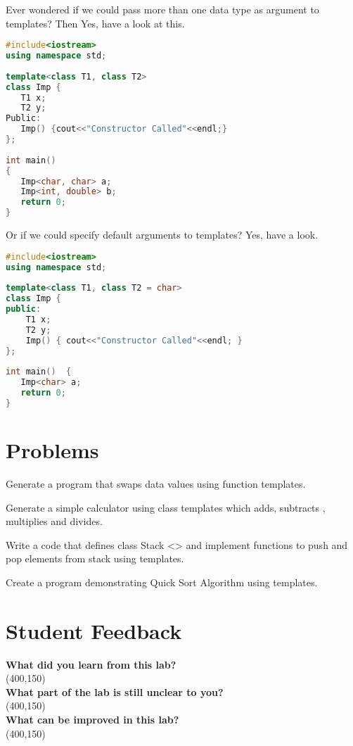 \documentclass[11pt,fleqn]{book} %
\begin{document}
Ever wondered if we could pass more than one data type as argument to templates? Then Yes, have a look at this.

\begin{lstlisting}[language=C++, caption= Important Fact 1]
#include<iostream>
using namespace std;
 
template<class T1, class T2>
class Imp {
   T1 x;
   T2 y;
Public:
   Imp() {cout<<"Constructor Called"<<endl;}
};
 
int main()  
{
   Imp<char, char> a;
   Imp<int, double> b;
   return 0;
}
\end{lstlisting}

Or if we could specify default arguments to templates? Yes, have a look.
\begin{lstlisting}[language=C++, caption= Important Fact 2]
#include<iostream>
using namespace std;
 
template<class T1, class T2 = char>
class Imp {
public:
    T1 x;
    T2 y;
    Imp() { cout<<"Constructor Called"<<endl; }
};
 
int main()  {
   Imp<char> a; 
   return 0;
}
\end{lstlisting}

\section{Problems}

\begin{problem} Generate a program that swaps data values using function templates.\\
\end{problem}
\begin{problem} Generate a simple calculator using class templates which adds, subtracts , multiplies and divides.\\
\end{problem}
\begin{problem} Write a code that defines class Stack <> and implement functions to push and pop elements from stack using templates.\\
\end{problem}
\begin{problem} Create a program demonstrating Quick Sort Algorithm using templates.
\end{problem}

\newpage
\section{Student Feedback}
\textbf{What did you learn from this lab?}\\ 
\framebox(400,150){}\\
\textbf{What part of the lab is still unclear to you?}\\
\framebox(400,150){}\\
\textbf{What can be improved in this lab?}\\ 
\framebox(400,150){}\\
\end{document}
